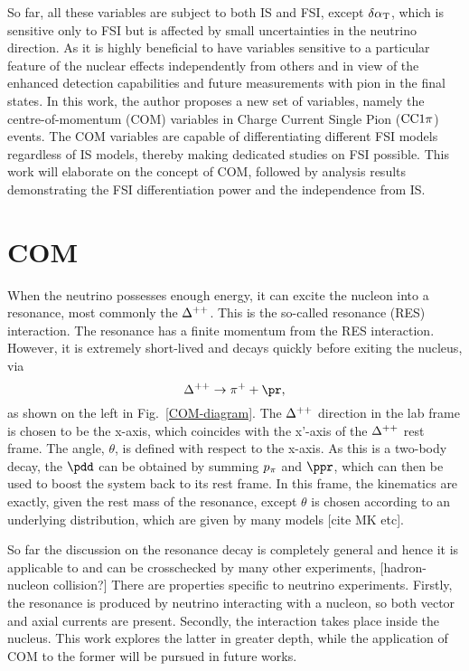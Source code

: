 So far, all these variables are subject to both IS and FSI, except $\delta\alpha_\textrm{T}$, which is sensitive only to FSI but is affected by small uncertainties in the neutrino direction. As it is highly beneficial to have variables sensitive to a particular feature of the nuclear effects independently from others and in view of the enhanced detection capabilities and future measurements with pion in the final states. In this work, the author proposes a new set of variables, namely the centre-of-momentum (COM) variables in Charge Current Single Pion ($\textrm{CC}1\pi$) events. The COM variables are capable of differentiating different FSI models regardless of IS models, thereby making dedicated studies on FSI possible. This work will elaborate on the concept of COM, followed by analysis results demonstrating the FSI differentiation power and the independence from IS. 

\section{COM}
When the neutrino possesses enough energy, it can excite the nucleon into a resonance, most commonly the $\Delta^{++}$. This is the so-called resonance (RES) interaction. The resonance has a finite momentum from the RES interaction. However, it is extremely short-lived and decays quickly before exiting the nucleus, via 
\begin{equation}
	\deltapp \rightarrow \pip + \pr,
\end{equation}
as shown on the left in Fig.~\ref{COM-diagram}. The $\Delta^{++}$ direction in the lab frame is chosen to be the x-axis, which coincides with the x’-axis of the $\Delta^{++}$ rest frame. The angle, $\theta$, is defined with respect to the x-axis. As this is a two-body decay, the $\pdd$ can be obtained by summing $p_{\pi}$ and $\ppr$, which can then be used to boost the system back to its rest frame. In this frame, the kinematics are exactly, given the rest mass of the resonance, except $\theta$ is chosen according to an underlying distribution, which are given by many models [cite MK etc]. 


So far the discussion on the resonance decay is completely general and hence it is applicable to and can be crosschecked by many other experiments, [hadron-nucleon collision?] There are properties specific to neutrino experiments. Firstly, the resonance is produced by neutrino interacting with a nucleon, so both vector and axial currents are present. Secondly, the interaction takes place inside the nucleus. This work explores the latter in greater depth, while the application of COM to the former will be pursued in future works. 


